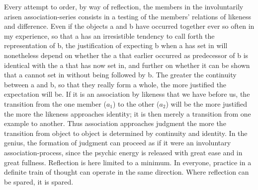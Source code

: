 \documentclass[12pt,a4paper]{book}
\newcommand{\opage}[1]{\marginnote{\footnotesize\textit{[#1]}}}
\begin{document}
Every attempt to order, by way of reflection, the members in the
involuntarily arisen association-series consists in a testing of the
members' relations of likeness and difference. Even if the objects a and b
have occurred together ever so often in my experience, so that a has an
irresistible tendency to call forth the representation of b, the
justification of expecting b when a has set in will nonetheless depend on
whether the a that earlier occurred as predecessor of b is identical with
the a that has now set in, and further on whether it can be shown that a
cannot set in without being followed by b. The greater the continuity
between a and b, so that they really form a whole, the more justified the
expectation will be. If it is an association by likeness that we have
before us, the transition from the \opage{61}one member ($a_1$) to the other ($a_2$)
will be the more justified the more the likeness approaches identity; it is
then merely a transition from one example to another. Thus association
approaches judgment the more the transition from object to object is
determined by continuity and identity. In the genius, the formation of
judgment can proceed as if it were an involuntary association-process,
since the psychic energy is released with great ease and in great fullness.
Reflection is here limited to a minimum. In everyone, practice in a
definite train of thought can operate in the same direction. Where
reflection can be spared, it is spared.
\end{document}
